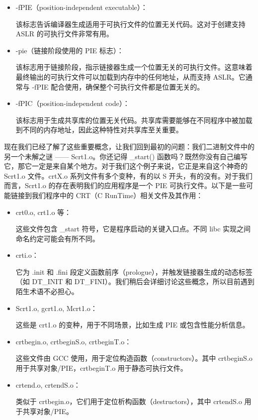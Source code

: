 \begin{itemize}
\item 
-fPIE（position-independent executable）：

该标志告诉编译器生成适用于可执行文件的位置无关代码。这对于创建支持 ASLR 的可执行文件非常有用。

\item 
-pie（链接阶段使用的 PIE 标志）：

该标志用于链接阶段，指示链接器生成一个位置无关的可执行文件。这意味着最终输出的可执行文件可以加载到内存中的任何地址，从而支持 ASLR。它通常与 -fPIE 配合使用，确保整个可执行文件都是位置无关的。

\item 
-fPIC（position-independent code）：

该标志用于生成共享库的位置无关代码。共享库需要能够在不同程序中被加载到不同的内存地址，因此这种特性对共享库至关重要。
\end{itemize}

现在我们已经了解了这些重要概念，让我们回到最初的问题：我们二进制文件中的另一个未解之谜 —— Scrt1.o。你还记得 \_start() 函数吗？既然你没有自己编写它，那它一定是来自某个地方。对于我们这个例子来说，它正是来自这个神奇的 Scrt1.o 文件。crtX.o 系列文件有多个变种，有的以 S 开头，有的没有。对于我们而言，Scrt1.o 的存在表明我们的应用程序是一个 PIE 可执行文件。以下是一些可能链接到我们程序中的 CRT（C RunTime）相关文件及其作用：

\begin{itemize}
\item 
crt0.o, crt1.o 等：

这些文件包含 \_start 符号，它是程序启动的关键入口点。不同 libc 实现之间命名约定可能会有所不同。

\item 
crti.o：

它为 .init 和 .fini 段定义函数前序（prologue），并触发链接器生成的动态标签（如 DT\_INIT 和 DT\_FINI）。我们稍后会详细讨论这些概念，所以目前遇到陌生术语不必担心。

\item 
Scrt1.o, gcrt1.o, Mcrt1.o：

这些是 crt1.o 的变种，用于不同场景，比如生成 PIE 或包含性能分析信息。

\item 
crtbegin.o, crtbeginS.o, crtbeginT.o：

这些文件由 GCC 使用，用于定位构造函数（constructors）。其中 crtbeginS.o 用于共享对象/PIE，crtbeginT.o 用于静态可执行文件。

\item 
crtend.o, crtendS.o：

类似于 crtbegin.o，它们用于定位析构函数（destructors），其中 crtendS.o 用于共享对象/PIE。
\end{itemize}

